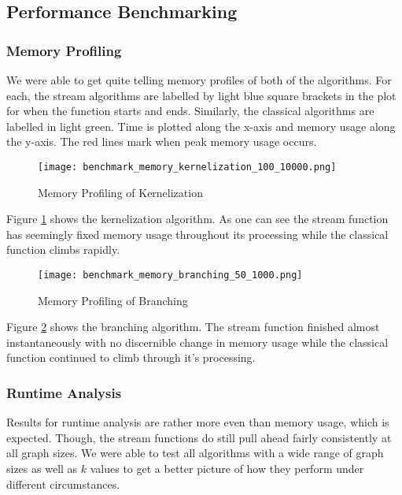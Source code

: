 \subsection{Performance Benchmarking}

\subsubsection{Memory Profiling}

We were able to get quite telling memory profiles of both of the algorithms.
For each, the stream algorithms are labelled by light blue square brackets in
the plot for when the function starts and ends. Similarly, the classical
algorithms are labelled in light green. Time is plotted along the x-axis and
memory usage along the y-axis. The red lines mark when peak memory usage occurs.

\begin{figure}[htb]
    \centering
    \texttt{[image: benchmark\_memory\_kernelization\_100\_10000.png]}
    \caption{Memory Profiling of Kernelization}
    \label{fig:benchmark_mem_kernelization}
\end{figure}

Figure \ref{fig:benchmark_mem_kernelization} shows the kernelization algorithm.
As one can see the stream function has seemingly fixed memory usage throughout
its processing while the classical function climbs rapidly.

\begin{figure}[htb]
    \centering
    \texttt{[image: benchmark\_memory\_branching\_50\_1000.png]}
    \caption{Memory Profiling of Branching}
    \label{fig:benchmark_mem_branching}
\end{figure}

Figure \ref{fig:benchmark_mem_branching} shows the branching algorithm. The
stream function finished almost instantaneously with no discernible change in
memory usage while the classical function continued to climb through it's
processing.

\subsubsection{Runtime Analysis}

Results for runtime analysis are rather more even than memory usage, which is
expected. Though, the stream functions do still pull ahead fairly consistently
at all graph sizes. We were able to test all algorithms with a wide range of
graph sizes as well as \(k\) values to get a better picture of how they perform
under different circumstances.

